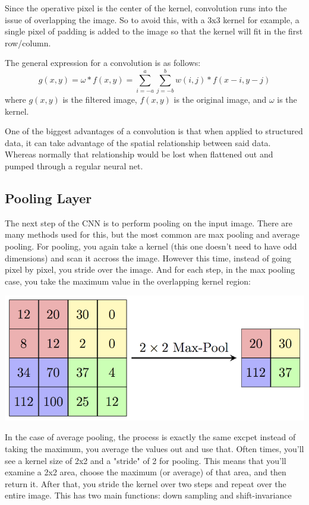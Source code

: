 \documentclass{article}
\begin{document}
        Since the operative pixel is the center of the kernel, convolution runs into the issue of overlapping the image. So to avoid this, with a 3x3 kernel for example, a single pixel of padding is added to the image so that the kernel will fit in the first row/column.

        The general expression for a convolution is as follows:
        \[ g(x, y) = \omega \ast f(x, y) = \sum_{i=-a}^{a} \sum_{j=-b}^{b} w(i, j) * f(x - i, y - j) \]
        where $g(x, y)$ is the filtered image, $f(x, y)$ is the original image, and $\omega$ is the kernel.

        One of the biggest advantages of a convolution is that when applied to structured data, it can take advantage of the spatial relationship between said data. Whereas normally that relationship would be lost when flattened out and pumped through a regular neural net.

    \subsection{Pooling Layer}
        The next step of the CNN is to perform pooling on the input image. There are many methods used for this, but the most common are max pooling and average pooling. For pooling, you again take a kernel (this one doesn't need to have odd dimensions) and scan it accross the image. However this time, instead of going pixel by pixel, you stride over the image. And for each step, in the max pooling case, you take the maximum value in the overlapping kernel region:
        
        \begin{center}
            \includegraphics{images/maxpool.png}
        \end{center}
        
        In the case of average pooling, the process is exactly the same excpet instead of taking the maximum, you average the values out and use that. Often times, you'll see a kernel size of 2x2 and a "stride" of 2 for pooling. This means that you'll examine a 2x2 area, choose the maximum (or average) of that area, and then return it. After that, you stride the kernel over two steps and repeat over the entire image. This has two main functions: down sampling and shift-invariance
        
\end{document}

